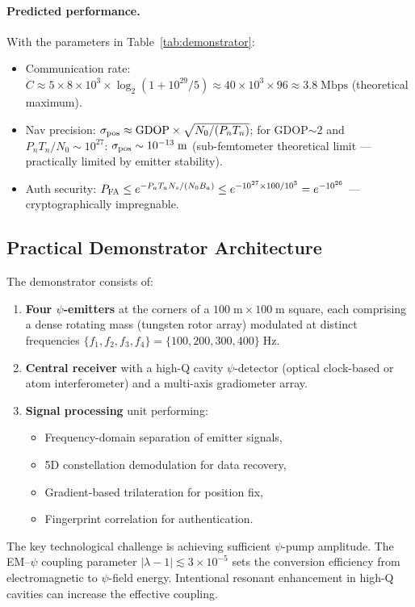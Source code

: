 \documentclass[twocolumn,superscriptaddress,prd,nofootinbib]{revtex4-2}
\begin{document}
\paragraph{Predicted performance.}
With the parameters in Table~\ref{tab:demonstrator}:
\begin{itemize}
\item Communication rate:
$C \approx 5\times 8\times 10^3\times\log_2(1 + 10^{29}/5)
\approx 40\times 10^3\times 96 \approx 3.8\;\text{Mbps}$ (theoretical maximum).
\item Nav precision:
$\sigma_{\rm pos} \approx \text{GDOP}\times\sqrt{N_0/(P_n T_n)}$;
for GDOP$\sim 2$ and $P_n T_n/N_0 \sim 10^{27}$:
$\sigma_{\rm pos} \sim 10^{-13}\;\text{m}$ (sub-femtometer theoretical
limit --- practically limited by emitter stability).
\item Auth security:
$P_{\rm FA} \leq e^{-P_a T_a N_s/(N_0 B_a)}
\leq e^{-10^{27}\times 100/10^3} = e^{-10^{26}}$ ---
cryptographically impregnable.
\end{itemize}

\subsection{Practical Demonstrator Architecture}

The demonstrator consists of:
\begin{enumerate}
\item \textbf{Four $\psi$-emitters} at the corners of a
$100\;\text{m}\times 100\;\text{m}$ square, each comprising a
dense rotating mass (tungsten rotor array) modulated at distinct
frequencies $\{f_1, f_2, f_3, f_4\} = \{100, 200, 300, 400\}\;\text{Hz}$.
\item \textbf{Central receiver} with a high-Q cavity $\psi$-detector
(optical clock-based or atom interferometer) and a multi-axis
gradiometer array.
\item \textbf{Signal processing} unit performing:
\begin{itemize}
\item Frequency-domain separation of emitter signals,
\item 5D constellation demodulation for data recovery,
\item Gradient-based trilateration for position fix,
\item Fingerprint correlation for authentication.
\end{itemize}
\end{enumerate}

The key technological challenge is achieving sufficient $\psi$-pump
amplitude. The EM--$\psi$ coupling parameter
$|\lambda - 1| \lesssim 3\times 10^{-5}$ sets the conversion efficiency
from electromagnetic to $\psi$-field energy. Intentional resonant
enhancement in high-Q cavities can increase the effective coupling.
\end{document}
